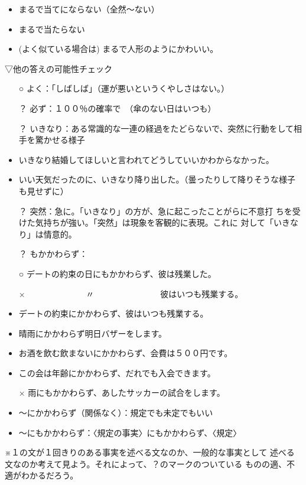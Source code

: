 \documentclass[
uplatex,
b5paper,
10pt,
dvipdfmx
]{jsbook}
\begin{document}
\begin{enumerate}
 \begin{itemize}
  \item まるで当てにならない（全然〜ない）
  \item まるで当たらない
  \item (よく似ている場合は) まるで人形のようにかわいい。
 \end{itemize}

▽他の答えの可能性チェック

 \begin{itemize}
  \item[○] よく：「しばしば」（運が悪いというくやしさはない。）
  \item[？] 必ず：１００％の確率で　（傘のない日はいつも）
  \item[？] いきなり：ある常識的な一連の経過をたどらないで、突然に行動をして相手を驚かせる様子
  \item いきなり結婚してほしいと言われてどうしていいかわからなかった。
  \item いい天気だったのに、いきなり降り出した。（曇ったりして降りそうな様子も見せずに）
  \item[？] 突然：急に。「いきなり」の方が、急に起こったことがらに不意打
	    ちを受けた気持ちが強い。「突然」は現象を客観的に表現。これに
	    対して「いきなり」は情意的。
  \item[？] もかかわらず：
  \item[○] デートの約束の日にもかかわらず、彼は残業した。 
  \item[×] 　　　　　　　〃　　　　　　　　彼はいつも残業する。
  \item デートの約束にかかわらず、彼はいつも残業する。
  \item 晴雨にかかわらず明日バザーをします。
  \item お酒を飲む飲まないにかかわらず、会費は５００円です。
  \item この会は年齢にかかわらず、だれでも入会できます。
  \item[×] 雨にもかかわらず、あしたサッカーの試合をします。
  \item 〜にかかわらず（関係なく）：規定でも未定でもいい
  \item 〜にもかかわらず：〈規定の事実〉にもかかわらず、〈規定〉
 \end{itemize}

       ※１の文が１回きりのある事実を述べる文なのか、一般的な事実として
       述べる文なのか考えて見よう。それによって、？のマークのついている
       ものの適、不適がわかるだろう。


\end{enumerate}
\end{document}

